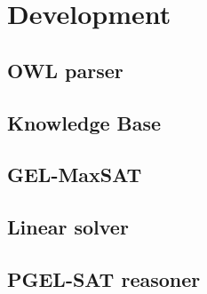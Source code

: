 
\chapter{Development}
\label{cap:development}

\section{OWL parser}

\section{Knowledge Base}

\section{GEL-MaxSAT}

\section{Linear solver}

\section{PGEL-SAT reasoner}
